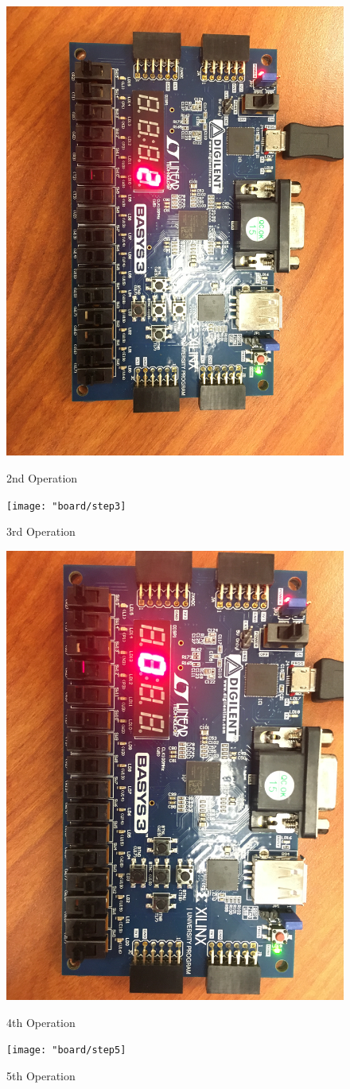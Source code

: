 \documentclass[11pt]{article}
\begin{document}
\begin{figure}[ht]
	\centering
	\includegraphics[width=12cm]{"board/step2"}
	\caption{2nd Operation}
	\texttt{[image: "board/step3]}
	\caption{3rd Operation}
\end{figure}
\begin{figure}[ht]
	\centering
	\includegraphics[width=12cm]{"board/step4"}
	\caption{4th Operation}
	\texttt{[image: "board/step5]}
	\caption{5th Operation}
\end{figure}
\end{document}
